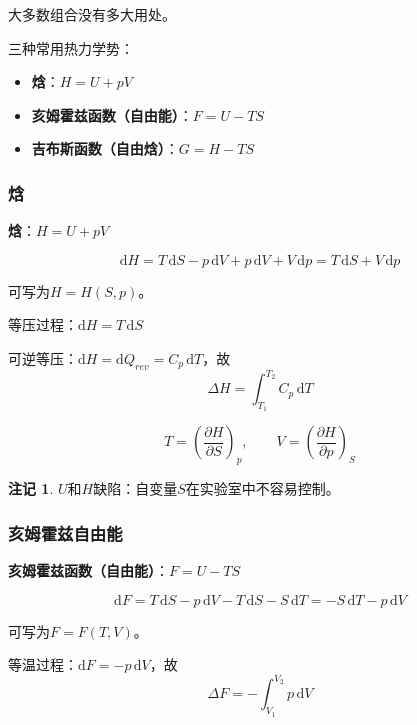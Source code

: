 \documentclass[UTF8]{ctexart}
\theoremstyle{definition}
\newtheorem{remark}{注记}
\begin{document}
大多数组合没有多大用处。

三种常用热力学势：
\begin{itemize}
\item \textbf{焓}：$H = U + pV$
\item \textbf{亥姆霍兹函数（自由能）}：$F = U - TS$
\item \textbf{吉布斯函数（自由焓）}：$G = H - TS$
\end{itemize}

\subsubsection*{焓}

\textbf{焓}：$H = U + pV$

\begin{equation}
\mathrm{d}H = T\,\mathrm{d}S - p\,\mathrm{d}V + p\,\mathrm{d}V + V\,\mathrm{d}p = T\,\mathrm{d}S + V\,\mathrm{d}p
\end{equation}

可写为$H = H(S,p)$。

等压过程：$\mathrm{d}H = T\,\mathrm{d}S$

可逆等压：$\mathrm{d}H = \mathrm{d}Q_{rev} = C_p\,\mathrm{d}T$，故
\begin{equation}
\Delta H = \int_{T_1}^{T_2} C_p\,\mathrm{d}T
\end{equation}

\begin{equation}
T = \left(\frac{\partial H}{\partial S}\right)_p,\qquad V = \left(\frac{\partial H}{\partial p}\right)_S
\end{equation}

\begin{remark}
$U$和$H$缺陷：自变量$S$在实验室中不容易控制。
\end{remark}

\subsubsection*{亥姆霍兹自由能}

\textbf{亥姆霍兹函数（自由能）}：$F = U - TS$

\begin{equation}
\mathrm{d}F = T\,\mathrm{d}S - p\,\mathrm{d}V - T\,\mathrm{d}S - S\,\mathrm{d}T = -S\,\mathrm{d}T - p\,\mathrm{d}V
\end{equation}

可写为$F = F(T,V)$。

等温过程：$\mathrm{d}F = -p\,\mathrm{d}V$，故
\begin{equation}
\Delta F = -\int_{V_1}^{V_2} p\,\mathrm{d}V
\end{equation}
\end{document}

